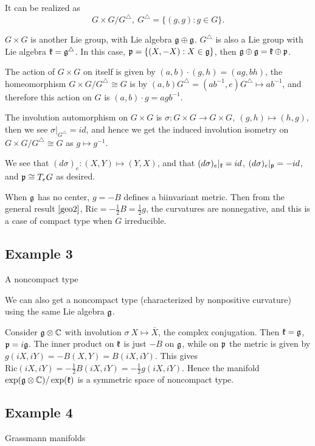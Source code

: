 	It can be realized as $$G\times G/G^{\triangle},\ G^{\triangle}=\{(g,g):g\in G\}.$$
	
	$G\times G$ is another Lie group, with Lie algebra ${\mathfrak g}\oplus{\mathfrak g}$. $G^{\triangle} $ is also a Lie group with Lie algebra ${\mathfrak k}={\mathfrak g}^{\triangle}$. In this case, ${\mathfrak p}=\{(X,-X):X\in {\mathfrak g}\}$, then ${\mathfrak g}\oplus{\mathfrak g}={\mathfrak k}\oplus{\mathfrak p}$. 
	
	The action of $G\times G$ on itself is given by $(a,b)\cdot (g,h)=(ag,bh)$, the homeomorphism $G\times G/G^{\triangle}\cong G$ is by $(a,b)G^{\triangle}=(ab^{-1},e)G^{\triangle}\mapsto ab^{-1}$, and therefore this action on $G$ is $(a,b)\cdot g=agb^{-1}$.

	The involution automorphism on $G\times G$ is $\sigma:G\times G\to G\times G,\ (g,h)\mapsto (h,g)$, then we see $\sigma|_{G^{\triangle}}=id$, and hence we get the induced involution isometry on $G\times G/G^{\triangle}\cong G$ as $g\mapsto g^{-1}$.
	
	We see that $(d\sigma)_e:
	(X,Y)\mapsto (Y,X)$, and that $(d\sigma)_e|_{{\mathfrak k}}=id$, $(d\sigma)_e|_{{\mathfrak p}}=-id$, and ${\mathfrak p}\cong T_eG$ as desired.

	When ${\mathfrak g}$ has no center, $g=-B$ defines a biinvariant
	metric. Then from the general result $\ref{geo2}$,
	$\mathrm{Ric}=-\frac{1}{2}B=\frac{1}{2}g$, the curvatures are
	nonnegative, and this is a case of compact type when $G$
	irreducible.

\subsection{Example 3}
\begin{center}
	A noncompact type
\end{center}
	
	We can also get a noncompact type (characterized by nonpositive curvature) using the same Lie algebra  ${\mathfrak g}$. 
	
	Consider ${\mathfrak g}\otimes\mathbb C$ with involution $\sigma\:
	X\mapsto \bar X$, the complex conjugation. Then ${\mathfrak k}={\mathfrak g}$,
	${\mathfrak p}=i{\mathfrak g}$. The inner product on ${\mathfrak k}$ is just $-B$ on
	${\mathfrak g}$, while on ${\mathfrak p}$ the metric is given by
	$g(iX,iY)=-B(X,Y)=B(iX,iY)$. This gives
	$\mathrm{Ric}(iX,iY)=-\frac{1}{2}B(iX,iY)=-\frac{1}{2}g(iX,i
	Y)$. Hence the manifold $\exp({\mathfrak g}\otimes\mathbb
	C)/\exp({\mathfrak k})$ is a symmetric space of noncompact type.

\subsection{Example 4}
\begin{center}
	Grassmann manifolds
\end{center}			
	
